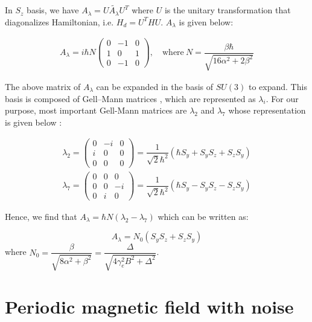 \documentclass[11pt,a4paper]{article}
\begin{document}
In $S_z$ basis, we have  $A_{\lambda}= U\tilde{A_{\lambda}} U^{T}$ where $U$ is the unitary transformation that diagonalizes Hamiltonian, i.e. $H_d= U^THU$. $A_{\lambda}$ is given below:

\begin{align*}
A_{\lambda}=i\hbar N
\begin{pmatrix}
0 & -1 & 0\\
1 & 0 & 1 \\
0 & -1 & 0
\end{pmatrix}, \quad \mbox{where} ~ N =\dfrac{ \beta \hbar}{\sqrt{16 \alpha^{2} + 2\beta^{2}}}
\end{align*}





The above matrix of $A_{\lambda}$ can be expanded in the basis of $SU(3)$ to expand. This basis is composed of Gell–Mann matrices \cite{gell1962symmetries}, which are represented as $\lambda_i$. For our purpose, most important Gell-Mann matrices are $\lambda_2$ and $\lambda_7$ whose representation is given below \cite{ bertlmann2008bloch, krammer2009entanglement}:

\begin{align*}
\lambda_2 = \begin{pmatrix} 0 & -i & 0 \\ i & 0 & 0 \\ 0 & 0 & 0 \end{pmatrix} 
= \dfrac{1}{\sqrt{2} \hbar^2}(\hbar S_y+ S_y S_z+  S_z S_y)\\
\lambda_7= \begin{pmatrix} 0 & 0 & 0\\0 & 0 & -i \\0 & i & 0\end{pmatrix}= \dfrac{1}{\sqrt{2} \hbar^2}(\hbar S_y- S_y S_z-  S_z S_y)
\end{align*}

Hence, we find that $A_{\lambda}=\hbar N(\lambda_2- \lambda_7)$ which can be written as:

\begin{equation}
\boxed{
A_{\lambda}=N_0(S_y S_z+  S_z S_y)}
\end{equation}
where $N_0 =\dfrac{ \beta }{\sqrt{8 \alpha^{2} + \beta^{2}}}= \dfrac{ \Delta }{ \sqrt{4  \gamma_e^2 B^2 + \Delta^2}}$.



 
\section{Periodic magnetic field with noise}
\end{document}
